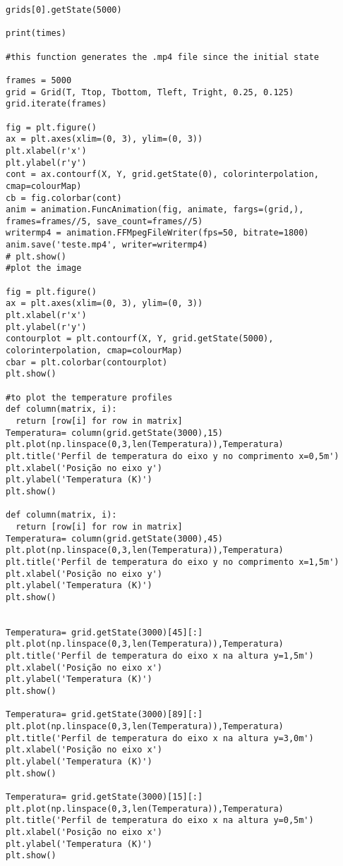 \documentclass[article]{abntex2}
\begin{document}
\begin{lstlisting}
grids[0].getState(5000)

print(times)

#this function generates the .mp4 file since the initial state 

frames = 5000
grid = Grid(T, Ttop, Tbottom, Tleft, Tright, 0.25, 0.125)
grid.iterate(frames)

fig = plt.figure()
ax = plt.axes(xlim=(0, 3), ylim=(0, 3))  
plt.xlabel(r'x')
plt.ylabel(r'y')
cont = ax.contourf(X, Y, grid.getState(0), colorinterpolation, cmap=colourMap)
cb = fig.colorbar(cont)
anim = animation.FuncAnimation(fig, animate, fargs=(grid,), frames=frames//5, save_count=frames//5)
writermp4 = animation.FFMpegFileWriter(fps=50, bitrate=1800)
anim.save('teste.mp4', writer=writermp4)
# plt.show()
#plot the image

fig = plt.figure()
ax = plt.axes(xlim=(0, 3), ylim=(0, 3))  
plt.xlabel(r'x')
plt.ylabel(r'y')
contourplot = plt.contourf(X, Y, grid.getState(5000), colorinterpolation, cmap=colourMap)
cbar = plt.colorbar(contourplot)
plt.show()

#to plot the temperature profiles
def column(matrix, i):
  return [row[i] for row in matrix]
Temperatura= column(grid.getState(3000),15)
plt.plot(np.linspace(0,3,len(Temperatura)),Temperatura)
plt.title('Perfil de temperatura do eixo y no comprimento x=0,5m')
plt.xlabel('Posição no eixo y')
plt.ylabel('Temperatura (K)')
plt.show()

def column(matrix, i):
  return [row[i] for row in matrix]
Temperatura= column(grid.getState(3000),45)
plt.plot(np.linspace(0,3,len(Temperatura)),Temperatura)
plt.title('Perfil de temperatura do eixo y no comprimento x=1,5m')
plt.xlabel('Posição no eixo y')
plt.ylabel('Temperatura (K)')
plt.show()


Temperatura= grid.getState(3000)[45][:]
plt.plot(np.linspace(0,3,len(Temperatura)),Temperatura)
plt.title('Perfil de temperatura do eixo x na altura y=1,5m')
plt.xlabel('Posição no eixo x')
plt.ylabel('Temperatura (K)')
plt.show()

Temperatura= grid.getState(3000)[89][:]
plt.plot(np.linspace(0,3,len(Temperatura)),Temperatura)
plt.title('Perfil de temperatura do eixo x na altura y=3,0m')
plt.xlabel('Posição no eixo x')
plt.ylabel('Temperatura (K)')
plt.show()

Temperatura= grid.getState(3000)[15][:]
plt.plot(np.linspace(0,3,len(Temperatura)),Temperatura)
plt.title('Perfil de temperatura do eixo x na altura y=0,5m')
plt.xlabel('Posição no eixo x')
plt.ylabel('Temperatura (K)')
plt.show()

\end{lstlisting}
\end{document}
